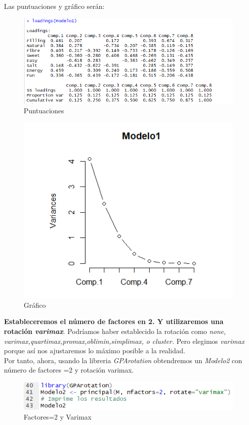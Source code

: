 \documentclass[12pt,a4paper]{book}
\begin{document}
Las puntuaciones y gráfico serán: 
\begin{figure}[H]
\centering
\includegraphics[scale=1]{Captura13.png} 
\caption{Puntuaciones}
\label{fig:p2}
\end{figure}
\begin{figure}[H]
\centering
\includegraphics[scale=1]{Captura14.png} 
\caption{Gráfico}
\label{fig:g}
\end{figure}
\textbf{Estableceremos el número de factores en 2. 
Y utilizaremos una rotación \textit{varimax}}. Podríamos haber establecido la rotación como \textit{none, varimax,quartimax,promax,oblimin,simplimax, o cluster.} Pero elegimos \textit{varimax} porque así nos ajustaremos lo máximo posible a la realidad.
\\Por tanto, ahora, usando la libreria \textit{GPArotation} obtendremos un  \textit{Modelo2} con número de factores =2 y rotación varimax. 
\begin{figure}[H]
\centering
\includegraphics[scale=1]{Captura15.png} 
\caption{Factores=2 y Varimax}
\label{fig:vm}
\end{figure}
\end{document}
